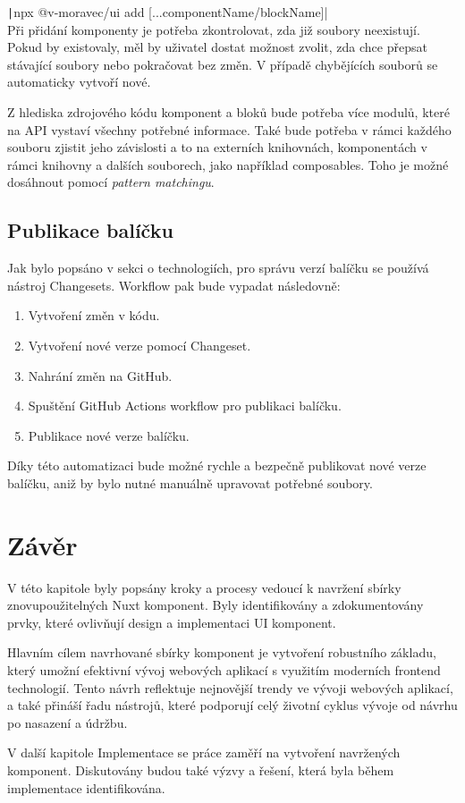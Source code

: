 \texttt|npx @v-moravec/ui add [...componentName/blockName]|\\

Při přidání komponenty je potřeba zkontrolovat, zda již soubory neexistují. Pokud by existovaly, měl by uživatel dostat možnost zvolit, zda chce přepsat stávající soubory nebo pokračovat bez změn. V případě chybějících souborů se automaticky vytvoří nové.

Z hlediska zdrojového kódu komponent a bloků bude potřeba více modulů, které na API vystaví všechny potřebné informace. Také bude potřeba v rámci každého souboru zjistit jeho závislosti a to na externích knihovnách, komponentách v rámci knihovny a dalších souborech, jako například composables. Toho je možné dosáhnout pomocí \emph{pattern matchingu}.

\subsection{Publikace balíčku}
Jak bylo popsáno v sekci o technologiích, pro správu verzí balíčku se používá nástroj Changesets. Workflow pak bude vypadat následovně:

\begin{enumerate}
  \item Vytvoření změn v kódu.
  \item Vytvoření nové verze pomocí Changeset.
  \item Nahrání změn na GitHub.
  \item Spuštění GitHub Actions workflow pro publikaci balíčku.
  \item Publikace nové verze balíčku.
\end{enumerate}

Díky této automatizaci bude možné rychle a bezpečně publikovat nové verze balíčku, aniž by bylo nutné manuálně upravovat potřebné soubory.

\section{Závěr}
V této kapitole byly popsány kroky a procesy vedoucí k navržení sbírky znovupoužitelných Nuxt komponent. Byly identifikovány a zdokumentovány prvky, které ovlivňují design a implementaci UI komponent.

Hlavním cílem navrhované sbírky komponent je vytvoření robustního základu, který umožní efektivní vývoj webových aplikací s využitím moderních frontend technologií. Tento návrh reflektuje nejnovější trendy ve vývoji webových aplikací, a také přináší řadu nástrojů, které podporují celý životní cyklus vývoje od návrhu po nasazení a údržbu.

V další kapitole Implementace se práce zaměří na vytvoření navržených komponent. Diskutovány budou také výzvy a řešení, která byla během implementace identifikována.


